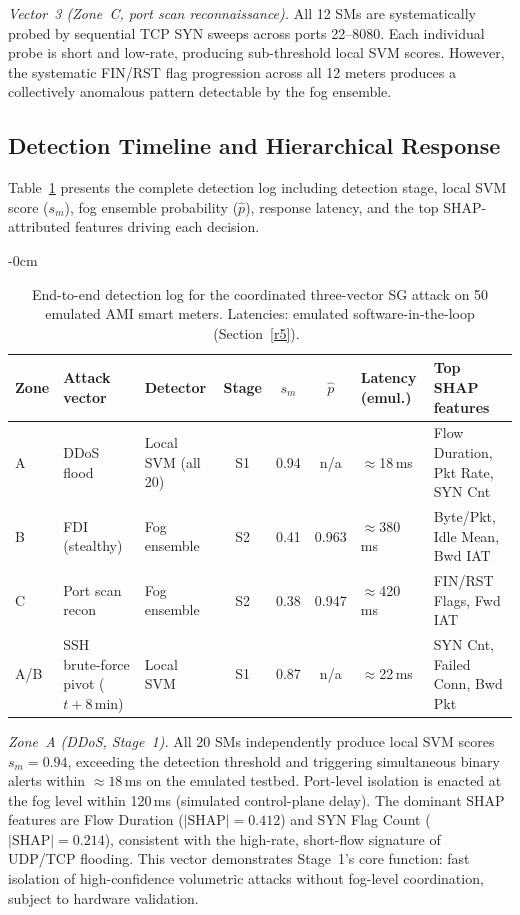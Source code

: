 \documentclass[sensors,article,submit,pdftex,moreauthors]{Definitions/mdpi}
\begin{document}
\noindent\textit{Vector~3 (Zone~C, port scan reconnaissance).} All 12 SMs are systematically probed by sequential TCP SYN sweeps across ports 22--8080. Each individual probe is short and low-rate, producing sub-threshold local SVM scores. However, the systematic FIN/RST flag progression across all 12 meters produces a collectively anomalous pattern detectable by the fog ensemble.

\subsection{Detection Timeline and Hierarchical Response}

Table~\ref{tab:casestudy} presents the complete detection log including detection stage, local SVM score ($s_m$), fog ensemble probability ($\hat{p}$), response latency, and the top SHAP-attributed features driving each decision.

\begin{table}[H]
\caption{End-to-end detection log for the coordinated three-vector SG attack on 50 emulated AMI smart meters. Latencies: emulated software-in-the-loop (Section~\ref{r5}).~\label{tab:casestudy}}
	\begin{adjustwidth}{-\extralength}{0cm}
		\begin{tabularx}{\fulllength}{@{}p{0.65cm} >{\raggedright\arraybackslash}X >{\raggedright\arraybackslash}X c c c >{\raggedright\arraybackslash}p{1.4cm} >{\raggedright\arraybackslash}X@{}}
\toprule
\textbf{Zone} & \textbf{Attack vector} & \textbf{Detector} & \textbf{Stage} & $s_m$ & $\hat{p}$ & \textbf{Latency (emul.)} & \textbf{Top SHAP features} \\
\midrule
A   & DDoS flood & Local SVM (all 20) & S1 & 0.94 & n/a & ${\approx}$18\,ms & Flow Duration, Pkt Rate, SYN Cnt \\
B   & FDI (stealthy) & Fog ensemble & S2 & 0.41 & 0.963 & ${\approx}$380\,ms & Byte/Pkt, Idle Mean, Bwd IAT \\
C   & Port scan recon & Fog ensemble & S2 & 0.38 & 0.947 & ${\approx}$420\,ms & FIN/RST Flags, Fwd IAT \\
A/B & SSH brute-force pivot ($t{+}8$\,min) & Local SVM & S1 & 0.87 & n/a & ${\approx}$22\,ms & SYN Cnt, Failed Conn, Bwd Pkt \\
\bottomrule
\end{tabularx}
	\end{adjustwidth}
\end{table}

\noindent\textit{Zone~A (DDoS, Stage~1).} All 20 SMs independently produce local SVM scores $s_m{=}0.94$, exceeding the detection threshold and triggering simultaneous binary alerts within ${\approx}18$\,ms on the emulated testbed. Port-level isolation is enacted at the fog level within 120\,ms (simulated control-plane delay). The dominant SHAP features are Flow Duration ($|\text{SHAP}|{=}0.412$) and SYN Flag Count ($|\text{SHAP}|{=}0.214$), consistent with the high-rate, short-flow signature of UDP/TCP flooding. This vector demonstrates Stage~1's core function: fast isolation of high-confidence volumetric attacks without fog-level coordination, subject to hardware validation.
\end{document}
